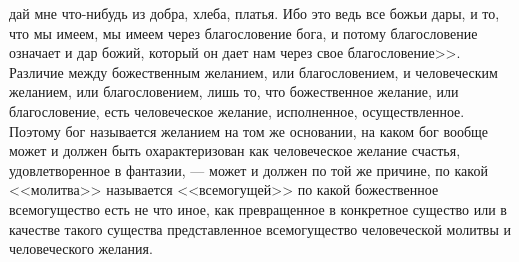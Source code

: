 \documentclass[12pt]{article}
\begin{document}
дай мне что-нибудь из добра, хлеба, платья. Ибо это ведь все божьи дары, и то, что мы имеем, мы имеем через благословение бога, и потому благословение означает и дар божий, который он дает нам через свое благословение>>. Различие между божественным желанием, или благословением, и человеческим желанием, или благословением, лишь то, что божественное желание, или благословение, есть человеческое желание, исполненное, осуществленное. Поэтому бог называется желанием на том же основании, на каком бог вообще может и должен быть охарактеризован как человеческое желание счастья, удовлетворенное в фантазии, --- может и должен по той же причине, по какой <<молитва>> называется <<всемогущей>>  по какой божественное всемогущество есть не что иное, как превращенное в конкретное существо или в качестве такого существа представленное всемогущество человеческой молитвы и человеческого желания. 
\end{document}
